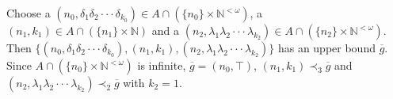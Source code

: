 \documentclass[preprint,12pt]{elsarticle}
\numberwithin{equation}{section}
\begin{document}


Choose a $(n_{0},\delta_{1}\delta_{2}\cdot\cdot\cdot\delta_{k_{0}})\in A\cap(\{n_{0}\}\times\mathbb{N}^{<\omega})$, a $(n_{1},k_{1})\in A\cap(\{n_{1}\}\times\mathbb{N})$ and a $(n_{2},\lambda_{1}\lambda_{2}\cdot\cdot\cdot\lambda_{k_{2}})\in A\cap(\{n_{2}\}\times\mathbb{N}^{<\omega})$.
Then $\{(n_{0},\delta_{1}\delta_{2}\cdot\cdot\cdot\delta_{k_{0}}),(n_{1},k_{1}),(n_{2},\lambda_{1}\lambda_{2}\cdot\cdot\cdot\lambda_{k_{2}})\}$ has an upper bound $\overline{g}$. Since $A\cap (\{n_{0}\}\times \mathbb{N}^{<\omega})$ is infinite, $\overline{g}=(n_{0},\top)$, $(n_{1},k_{1})\prec_{3}\overline{g}$ and $(n_{2},\lambda_{1}\lambda_{2}\cdot\cdot\cdot\lambda_{k_{2}})\prec_{2}\overline{g}$ with $k_{2}=1$.







\end{document}
